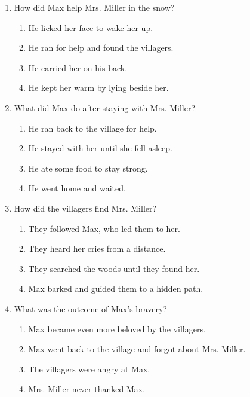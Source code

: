 \documentclass[12pt]{article}
\begin{document}
\begin{enumerate}
    \vspace{0.5cm}

    \item How did Max help Mrs. Miller in the snow?

    \begin{enumerate}[label=\Alph*.]
        \item He licked her face to wake her up.
        \item He ran for help and found the villagers.
        \item He carried her on his back.
        \item He kept her warm by lying beside her.
    \end{enumerate}
    
    \vspace{0.5cm}

    \item What did Max do after staying with Mrs. Miller?

    \begin{enumerate}[label=\Alph*.]
        \item He ran back to the village for help.
        \item He stayed with her until she fell asleep.
        \item He ate some food to stay strong.
        \item He went home and waited.
    \end{enumerate}
    
    \vspace{0.5cm}

    \item How did the villagers find Mrs. Miller?

    \begin{enumerate}[label=\Alph*.]
        \item They followed Max, who led them to her.
        \item They heard her cries from a distance.
        \item They searched the woods until they found her.
        \item Max barked and guided them to a hidden path.
    \end{enumerate}
    
    \vspace{0.5cm}

    \item What was the outcome of Max’s bravery?

    \begin{enumerate}[label=\Alph*.]
        \item Max became even more beloved by the villagers.
        \item Max went back to the village and forgot about Mrs. Miller.
        \item The villagers were angry at Max.
        \item Mrs. Miller never thanked Max.
    \end{enumerate}
    

\end{enumerate}
\end{document}
